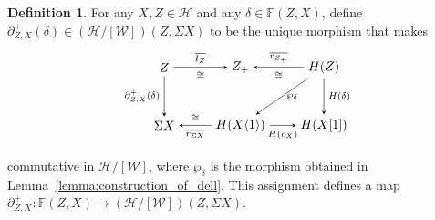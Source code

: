 \documentclass[a4paper,reqno,10pt]{amsart}
\theoremstyle{definition}
\newtheorem{definition}[definition]{Definition}
\theoremstyle{definition}
\theoremstyle{definition}
\theoremstyle{definition}
\theoremstyle{plain}
\newcommand{\BF}{\mathbb{F}}
\newcommand{\CH}{\mathcal{H}}
\newcommand{\CW}{\mathcal{W}}
\begin{document}
\begin{definition}\label{def:construction_of_dell}
For any $X,Z\in\CH$ and any $\delta\in\BF(Z,X)$, define $\partial^+_{Z,X}(\delta)\in(\CH/[\CW])(Z,\Sigma X)$ 
to be the unique morphism that makes
\color{blue}
\[
\begin{tikzpicture}[>=stealth]
\node (0) at (-2.2,0.8) {$Z$};
\node (1) at (-0.1,0.8) {$Z_+$};
\node (2) at (2.2,0.8) {$H(Z)$};
\node (3) at (-2.2,-0.8) {$\Sigma X$};
\node (4) at (-0.1,-0.8) {$H(X\langle1\rangle)$};
\node (5) at (2.2,-0.8) {$H(X[1])$};
\draw[->] (0) -- node[above,font=\scriptsize] {$\overline{l_Z}$}node[below,font=\scriptsize] {$\cong$}  (1);
\draw[->] (2) -- node[above,font=\scriptsize] {$\overline{r_{Z_+}}$} node[below,font=\scriptsize] {$\cong$} (1);
\draw[->] (0) -- node[left,font=\scriptsize] {$\partial^+_{Z,X}(\delta)$} (3);
\draw[->] (2) -- node[right,font=\scriptsize] {$\wp_{\delta}$} (4);
\draw[->] (4) -- node[below,font=\scriptsize] {$\overline{r_{\Sigma X}}$} node[above,font=\scriptsize] {$\cong$} (3);
\draw[->] (4) -- node[below,font=\scriptsize] {$H(c_X)$} (5);
\draw[->] (2) -- node[right,font=\scriptsize] {$H(\delta)$} (5);
\end{tikzpicture}
\]
\normalcolor
commutative in $\CH/[\CW]$, where $\wp_{\delta}$ is the morphism obtained in Lemma~\ref{lemma:construction_of_dell}.
This assignment defines a map
$
\partial^+_{Z,X}\colon\BF(Z,X)\to(\CH/[\CW])(Z,\Sigma X).
$
\end{definition}
\end{document}
